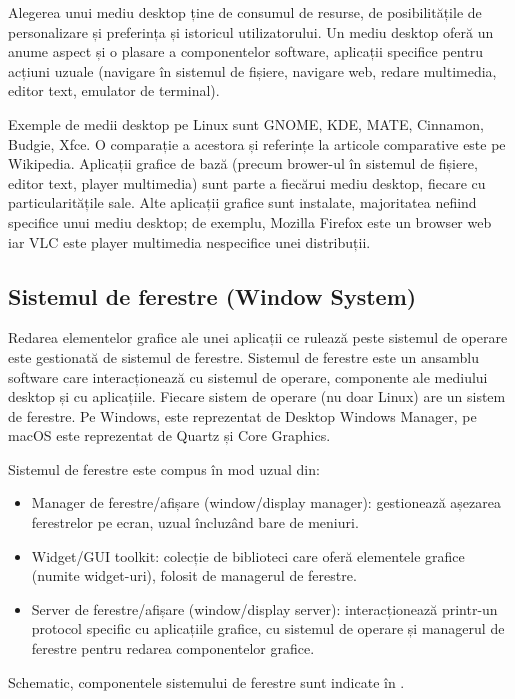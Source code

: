 Alegerea unui mediu desktop ține de consumul de resurse, de posibilitățile de personalizare și preferința și istoricul utilizatorului. Un mediu desktop oferă un anume aspect și o plasare a componentelor software, aplicații specifice pentru acțiuni uzuale (navigare în sistemul de fișiere, navigare web, redare multimedia, editor text, emulator de terminal).

Exemple de medii desktop pe Linux sunt GNOME, KDE, MATE, Cinnamon, Budgie, Xfce. O comparație a acestora și referințe la articole comparative este pe Wikipedia. Aplicații grafice de bază (precum brower-ul în sistemul de fișiere, editor text, player multimedia) sunt parte a fiecărui mediu desktop, fiecare cu particularitățile sale. Alte aplicații grafice sunt instalate, majoritatea nefiind specifice unui mediu desktop; de exemplu, Mozilla Firefox este un browser web iar VLC este player multimedia nespecifice unei distribuții.

\subsection{Sistemul de ferestre (Window System)}
\label{sec:ui:window-system}

Redarea elementelor grafice ale unei aplicații ce rulează peste sistemul de operare este gestionată de sistemul de ferestre. Sistemul de ferestre este un ansamblu software care interacționează cu sistemul de operare, componente ale mediului desktop și cu aplicațiile. Fiecare sistem de operare (nu doar Linux) are un sistem de ferestre. Pe Windows, este reprezentat de Desktop Windows Manager, pe macOS este reprezentat de Quartz și Core Graphics.

Sistemul de ferestre este compus în mod uzual din:

\begin{itemize}
  \item Manager de ferestre/afișare (window/display manager): gestionează așezarea ferestrelor pe ecran, uzual încluzând bare de meniuri.
  \item Widget/GUI toolkit: colecție de biblioteci care oferă elementele grafice (numite widget-uri), folosit de managerul de ferestre.
  \item Server de ferestre/afișare (window/display server): interacționează printr-un protocol specific cu aplicațiile grafice, cu sistemul de operare și managerul de ferestre pentru redarea componentelor grafice.
\end{itemize}

Schematic, componentele sistemului de ferestre sunt indicate în .

